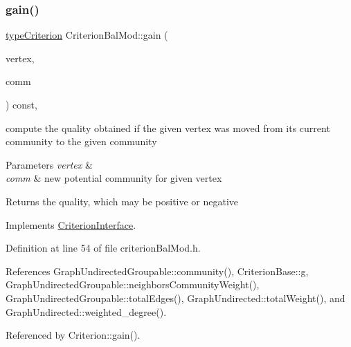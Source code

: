 \subsubsection{\texorpdfstring{gain()}{gain()}}
{\footnotesize\ttfamily \hyperlink{criterionInterface_8h_af71ff22f6355fd69a4a62104bfd59a83}{type\+Criterion} Criterion\+Bal\+Mod\+::gain (\begin{DoxyParamCaption}\item[{const \hyperlink{edge_8h_a5fbd20c46956d479cb10afc9855223f6}{type\+Vertex} \&}]{vertex,  }\item[{const \hyperlink{graphUndirectedGroupable_8h_a914da95c9ea7f14f4b7f875c36818556}{type\+Community} \&}]{comm }\end{DoxyParamCaption}) const\hspace{0.3cm}{\ttfamily [inline]}, {\ttfamily [virtual]}}

compute the quality obtained if the given vertex was moved from its current community to the given community


\begin{DoxyParams}{Parameters}
{\em vertex} & \\
\hline
{\em comm} & new potential community for given vertex \\
\hline
\end{DoxyParams}
\begin{DoxyReturn}{Returns}
the quality, which may be positive or negative 
\end{DoxyReturn}


Implements \hyperlink{classCriterionInterface_aa0beec8287cd70e16c057e7995d0caca}{Criterion\+Interface}.



Definition at line 54 of file criterion\+Bal\+Mod.\+h.



References Graph\+Undirected\+Groupable\+::community(), Criterion\+Base\+::g, Graph\+Undirected\+Groupable\+::neighbors\+Community\+Weight(), Graph\+Undirected\+Groupable\+::total\+Edges(), Graph\+Undirected\+::total\+Weight(), and Graph\+Undirected\+::weighted\+\_\+degree().



Referenced by Criterion\+::gain().

